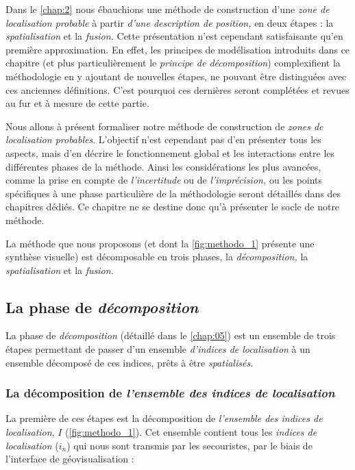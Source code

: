 Dans le \autoref{chap:2} nous ébauchions une méthode de construction
d'une \emph{zone de localisation probable} à partir \emph{d'une
  description de position,} en deux étapes : la \emph{spatialisation}
et la \emph{fusion.} Cette présentation n'est cependant satisfaisante
qu'en première approximation. En effet, les principes de modélisation
introduits dans ce chapitre (et plus particulièrement le
\emph{principe de décomposition}) complexifient la méthodologie en y
ajoutant de nouvelles étapes, ne pouvant être distinguées avec ces
anciennes définitions. C'est pourquoi ces dernières seront complétées
et revues au fur et à mesure de cette partie.

Nous allons à présent formaliser notre méthode de construction de
\emph{zones de localisation probables}. L'objectif n'est cependant pas
d'en présenter tous les aspects, mais d'en décrire le fonctionnement
global et les interactions entre les différentes phases de la
méthode. Ainsi les considérations les plus avancées, comme la prise en
compte de \emph{l'incertitude} ou de \emph{l'imprécision,} ou les
points spécifiques à une phase particulière de la méthodologie seront
détaillés dans des chapitres dédiés. Ce chapitre ne se destine donc qu'à
présenter le socle de notre méthode.

La méthode que nous proposons (et dont la \autoref{fig:methodo_1}
présente une synthèse visuelle) est décomposable en trois phases, la
\emph{décomposition,} la \emph{spatialisation} et la \emph{fusion.}

\subsection{La phase de \emph{décomposition}}

La phase de \emph{décomposition} (détaillé dans le \autoref{chap:05})
est un ensemble de trois étapes permettant de passer d'un ensemble
\emph{d'indices de localisation} à un ensemble décomposé de ces
indices, prêts à être \emph{spatialisés.}

\subsubsection{La décomposition de \emph{l'ensemble des indices de
    localisation}}

La première de ces étapes est la décomposition de \emph{l'ensemble des
  indices de localisation}, \(I\) (\autoref{fig:methodo_1}). Cet
ensemble contient tous les \emph{indices de localisation} (\(i_n\))
qui nous sont transmis par les secouristes, par le biais de
l'interface de géovisualisation :

